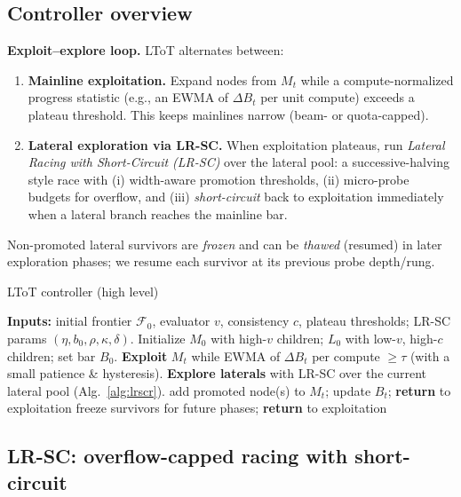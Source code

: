 \documentclass{article}
\begin{document}
\vspace{0.5em}
\subsection{Controller overview}
\label{sec:controller}

\textbf{Exploit--explore loop.}
LToT alternates between:
\begin{enumerate}
    \item \textbf{Mainline exploitation.} Expand nodes from $M_t$ while a compute-normalized progress statistic (e.g., an EWMA of $\Delta B_t$ per unit compute) exceeds a plateau threshold. This keeps mainlines narrow (beam- or quota-capped).
    \item \textbf{Lateral exploration via LR-SC.} When exploitation plateaus, run \emph{Lateral Racing with Short-Circuit (LR-SC)} over the lateral pool: a successive-halving style race with (i) width-aware promotion thresholds, (ii) micro-probe budgets for overflow, and (iii) \emph{short-circuit} back to exploitation immediately when a lateral branch reaches the mainline bar.
\end{enumerate}
Non-promoted lateral survivors are \emph{frozen} and can be \emph{thawed} (resumed) in later exploration phases; we resume each survivor at its previous probe depth/rung.

\begin{algorithm}[t]
\caption{LToT controller (high level)}
\label{alg:ltot-controller}
\begin{algorithmic}[1]
\State \textbf{Inputs:} initial frontier $\mathcal{F}_0$, evaluator $v$, consistency $c$, plateau thresholds; LR-SC params $(\eta,b_0,\rho, \kappa,\delta)$.
\State Initialize $M_0$ with high-$v$ children; $L_0$ with low-$v$, high-$c$ children; set bar $B_0$.
  \State \textbf{Exploit} $M_t$ while EWMA of $\Delta B_t$ per compute $\ge \tau$ (with a small patience \& hysteresis).
  \State \textbf{Explore laterals} with LR-SC over the current lateral pool (Alg.~\ref{alg:lrscr}). \label{line:lrscr}
     \State add promoted node(s) to $M_t$; update $B_t$; \textbf{return} to exploitation
  \Else
     \State freeze survivors for future phases; \textbf{return} to exploitation
  \EndIf
\EndWhile
\end{algorithmic}
\end{algorithm}

\vspace{-0.5em}
\subsection{LR-SC: overflow-capped racing with short-circuit}
\label{sec:lrscr}
\end{document}
